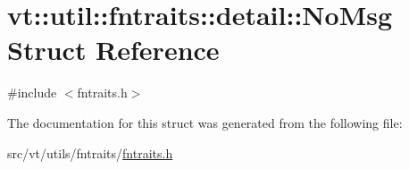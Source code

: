\hypertarget{structvt_1_1util_1_1fntraits_1_1detail_1_1_no_msg}{}\section{vt\+:\+:util\+:\+:fntraits\+:\+:detail\+:\+:No\+Msg Struct Reference}
\label{structvt_1_1util_1_1fntraits_1_1detail_1_1_no_msg}


{\ttfamily \#include $<$fntraits.\+h$>$}



The documentation for this struct was generated from the following file\+:\begin{DoxyCompactItemize}
\item 
src/vt/utils/fntraits/\hyperlink{fntraits_8h}{fntraits.\+h}\end{DoxyCompactItemize}
